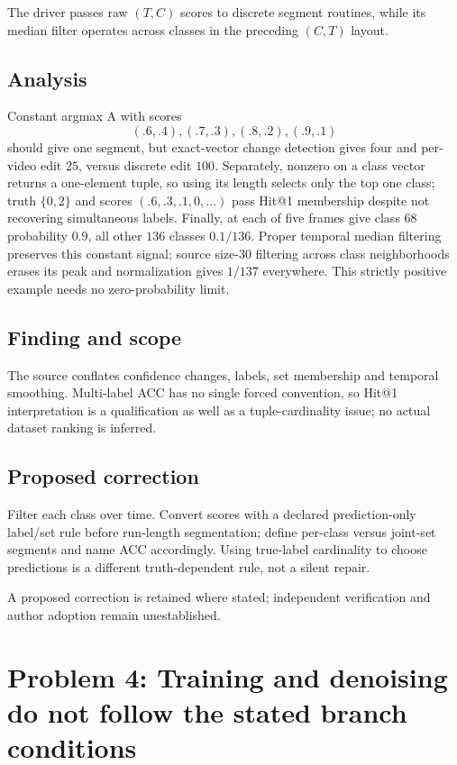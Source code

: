 \documentclass[11pt]{article}
\begin{document}
The driver passes raw \((T,C)\) scores to discrete segment routines, while its median filter operates across classes in the preceding \((C,T)\) layout.

\subsection*{Analysis}

Constant argmax A with scores \[(.6,.4),(.7,.3),(.8,.2),(.9,.1)\] should give one segment, but exact-vector change detection gives four and per-video edit \(25\), versus discrete edit \(100\). Separately, nonzero on a class vector returns a one-element tuple, so using its length selects only the top one class; truth \(\{0,2\}\) and scores \((.6,.3,.1,0,\ldots)\) pass Hit@1 membership despite not recovering simultaneous labels. Finally, at each of five frames give class \(68\) probability \(0.9\), all other \(136\) classes \(0.1/136\). Proper temporal median filtering preserves this constant signal; source size-\(30\) filtering across class neighborhoods erases its peak and normalization gives \(1/137\) everywhere. This strictly positive example needs no zero-probability limit.

\subsection*{Finding and scope}

The source conflates confidence changes, labels, set membership and temporal smoothing. Multi-label ACC has no single forced convention, so Hit@1 interpretation is a qualification as well as a tuple-cardinality issue; no actual dataset ranking is inferred.

\subsection*{Proposed correction}

Filter each class over time. Convert scores with a declared prediction-only label/set rule before run-length segmentation; define per-class versus joint-set segments and name ACC accordingly. Using true-label cardinality to choose predictions is a different truth-dependent rule, not a silent repair.

A proposed correction is retained where stated; independent verification and author adoption remain unestablished.

\section*{Problem 4: Training and denoising do not follow the stated branch conditions}
\end{document}
